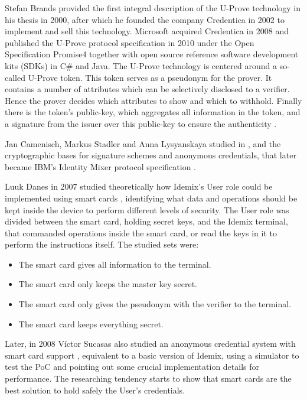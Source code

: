 \documentclass[journal]{IEEEtran}
\begin{document}




Stefan Brands provided the first integral description of the U-Prove
technology in his thesis \cite{uprove} in 2000, after which he founded the company Credentica
in 2002 to implement and sell this technology. Microsoft acquired Credentica
in 2008 and published the U-Prove protocol specification \cite{uprove2} in 2010
under the Open Specification Promise4 together with open source reference software
development kits (SDKs) in C\# and Java.
The U-Prove technology is centered around a so-called U-Prove token. This
token serves as a pseudonym for the prover. It contains a number of attributes
which can be selectively disclosed to a verifier. Hence the prover decides which
attributes to show and which to withhold. Finally there is the token’s public-key, which aggregates all information in the token, and a signature from the issuer
over this public-key to ensure the authenticity \cite{book:947508}.



\hfil

Jan Camenisch, Markus Stadler and Anna Lysyanskaya studied in \cite{Camenisch:GroupSig}, \cite{Camenisch:AnonCred} and \cite{camenisch2002signature} the cryptographic bases for signature schemes and anonymous credentials, that later became IBM's Identity Mixer protocol specification \cite{idemixSpec}.


Luuk Danes in 2007 studied theoretically how Idemix's User role could be implemented using  
smart cards \cite{luuk}, identifying what data and operations should be kept inside the device to perform different levels of security. The User role was divided between the smart card, holding secret keys, and the Idemix terminal, that commanded operations inside the smart card, or read the keys in it to perform the instructions itself. The studied sets were:
\begin{itemize}
	\item The smart card gives all information to the terminal.
	\item The smart card only keeps the master key secret.
	\item The smart card only gives the pseudonym with the verifier to the terminal.
	\item The smart card keeps everything secret.
\end{itemize}

Later, in 2008 Víctor Sucasas also studied an anonymous credential system with smart card support \cite{sucasas}, equivalent to a basic version of Idemix, using a simulator to test the PoC and pointing out some crucial implementation details for performance. The researching tendency starts to show that smart cards are the best solution to hold safely the User's credentials.
\end{document}
